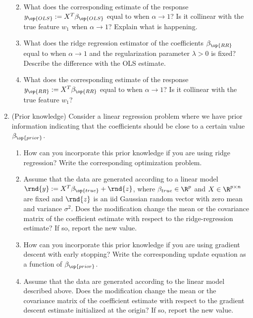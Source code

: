 \documentclass[12pt,twoside]{article}
\begin{document}
\begin{enumerate}
\begin{enumerate}
\begin{align}
\end{align}
   \item  What does the corresponding estimate of the response $y_{\op{OLS}} := X^T\beta_{\op{OLS}}$ equal to when $\alpha \rightarrow 1$? Is it collinear with the true feature $w_1$ when $\alpha \rightarrow 1$? Explain what is happening.
  \item What does the ridge regression estimator of the coefficients $\beta_{\op{RR}}$ equal to when $\alpha \rightarrow 1$ and the regularization parameter $\lambda >0$ is fixed? Describe the difference with the OLS estimate.
  \item  What does the corresponding estimate of the response $y_{\op{RR}} := X^T\beta_{\op{RR}}$ equal to when $\alpha \rightarrow 1$? Is it collinear with the true feature $w_1$?
  \end{enumerate} 
  
 \item (Prior knowledge) Consider a linear regression problem where we have prior information indicating that the coefficients should be close to a certain value $\beta_{\op{prior}}$. 
 \begin{enumerate}
   \item How can you incorporate this prior knowledge if you are using ridge regression? Write the corresponding optimization problem. 
   \item Assume that the data are generated according to a linear model $\rnd{y}:= X^T \beta_{\op{true}} + \rnd{z}$, where $\beta_{true}\in \R^{p}$ and $X  \in \R^{p \times n}$ are fixed and $\rnd{z}$ is an iid Gaussian random vector with zero mean and variance $\sigma^2$. Does the modification change the mean or the covariance matrix of the coefficient estimate with respect to the ridge-regression estimate? If so, report the new value.
    \item How can you incorporate this prior knowledge if you are using gradient descent with early stopping? Write the corresponding update equation as a function of $\beta_{\op{prior}}$.
    \item Assume that the data are generated according to the linear model described above. Does the modification change the mean or the covariance matrix of the coefficient estimate with respect to the gradient descent estimate initialized at the origin? If so, report the new value.
 \end{enumerate}
 

\end{enumerate}
\end{document}
